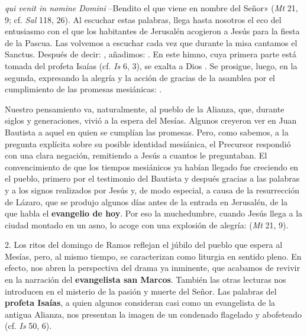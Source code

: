 
\begin{body}
 \textit{qui venit in nomine Domini} –Bendito el que viene en nombre del Señor» (\textit{Mt} 21, 9; cf. \textit{Sal} 118, 26).  Al escuchar estas palabras, llega hasta nosotros el eco del entusiasmo con el que los habitantes de Jerusalén acogieron a Jesús para la fiesta de la Pascua. Las volvemos a escuchar cada vez que durante la misa cantamos el Sanctus. Después de decir: , añadimos: . En este himno, cuya primera parte está tomada del profeta Isaías (cf. \textit{Is} 6, 3), se exalta a Dios . Se prosigue, luego, en la segunda, expresando la alegría y la acción de gracias de la asamblea por el cumplimiento de las promesas mesiánicas: .

Nuestro pensamiento va, naturalmente, al pueblo de la Alianza, que, durante siglos y generaciones, vivió a la espera del Mesías. Algunos creyeron ver en Juan Bautista a aquel en quien se cumplían las promesas. Pero, como sabemos, a la pregunta explícita sobre su posible identidad mesiánica, el Precursor respondió con una clara negación, remitiendo a Jesús a cuantos le preguntaban. El convencimiento de que los tiempos mesiánicos ya habían llegado fue creciendo en el pueblo, primero por el testimonio del Bautista y después gracias a las palabras y a los signos realizados por Jesús y, de modo especial, a causa de la resurrección de Lázaro, que se produjo algunos días antes de la entrada en Jerusalén, de la que habla el \textbf{evangelio de hoy}. Por eso la muchedumbre, cuando Jesús llega a la ciudad montado en un asno, lo acoge con una explosión de alegría:  (\textit{Mt} 21, 9).

2. Los ritos del domingo de Ramos reflejan el júbilo del pueblo que espera al Mesías, pero, al mismo tiempo, se caracterizan como liturgia  en sentido pleno. En efecto, nos abren la perspectiva del drama ya inminente, que acabamos de revivir en la narración del \textbf{evangelista san Marcos}. También las otras lecturas nos introducen en el misterio de la pasión y muerte del Señor. Las palabras del \textbf{profeta Isaías}, a quien algunos consideran casi como un evangelista de la antigua Alianza, nos presentan la imagen de un condenado flagelado y abofeteado (cf. \textit{Is} 50, 6). 


\end{body}
